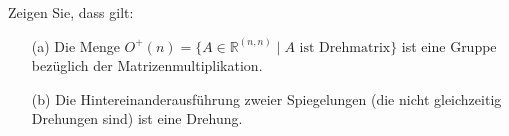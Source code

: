 Zeigen Sie, dass gilt:

\begin{enumerate}
    \item[(a)] Die Menge \( O^+(n) = \{ A \in \mathbb{R}^{(n,n)} \mid A \text{ ist Drehmatrix} \} \) ist eine Gruppe bezüglich der Matrizenmultiplikation.
    \item[(b)] Die Hintereinanderausführung zweier Spiegelungen (die nicht gleichzeitig Drehungen sind) ist eine Drehung.
\end{enumerate}
